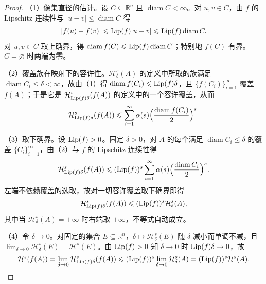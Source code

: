 \documentclass[../../main.tex]{subfiles}%
\begin{document}
\begin{proof}
（1）像集直径的估计。设 $C\subseteq\mathbb{R}^n$ 且 $\operatorname{diam}C<\infty$。对 $u,v\in C$，由 $f$ 的 Lipschitz 连续性与 $\lvert u-v\rvert\leqslant\operatorname{diam}C$ 得
\begin{align*}
\lvert f(u)-f(v)\rvert\leqslant\operatorname{Lip}(f)\lvert u-v\rvert\leqslant\operatorname{Lip}(f)\operatorname{diam}C .
\end{align*}
对 $u,v\in C$ 取上确界，得 $\operatorname{diam}f(C)\leqslant\operatorname{Lip}(f)\operatorname{diam}C$；特别地 $f(C)$ 有界。$C=\varnothing$ 时两端为零。

（2）覆盖族在映射下的容许性。$\mathcal{H}^s_\delta(A)$ 的定义中所取的族满足 $\operatorname{diam}C_i\leqslant\delta<\infty$，故由（1）得 $\operatorname{diam}f(C_i)\leqslant\operatorname{Lip}(f)\delta$，且 $\{f(C_i)\}_{i=1}^{\infty}$ 覆盖 $f(A)$；于是它是 $\mathcal{H}^s_{\operatorname{Lip}(f)\delta}(f(A))$ 的定义中的一个容许覆盖，从而
\begin{align*}
\mathcal{H}^s_{\operatorname{Lip}(f)\delta}(f(A))\leqslant\sum_{i=1}^{\infty}\alpha(s)\Bigl(\frac{\operatorname{diam}f(C_i)}{2}\Bigr)^s .
\end{align*}

（3）取下确界。设 $\operatorname{Lip}(f)>0$。固定 $\delta>0$，对 $A$ 的每个满足 $\operatorname{diam}C_i\leqslant\delta$ 的覆盖 $\{C_i\}_{i=1}^{\infty}$，由（2）与 $f$ 的 Lipschitz 连续性得
\begin{align*}
\mathcal{H}^s_{\operatorname{Lip}(f)\delta}(f(A))
\leqslant(\operatorname{Lip}(f))^s\sum_{i=1}^{\infty}\alpha(s)\Bigl(\frac{\operatorname{diam}C_i}{2}\Bigr)^s .
\end{align*}
左端不依赖覆盖的选取，故对一切容许覆盖取下确界即得
\begin{align*}
\mathcal{H}^s_{\operatorname{Lip}(f)\delta}(f(A))\leqslant(\operatorname{Lip}(f))^s\mathcal{H}^s_\delta(A),
\end{align*}
其中当 $\mathcal{H}^s_\delta(A)=+\infty$ 时右端取 $+\infty$，不等式自动成立。

（4）令 $\delta\to0$。对固定的集合 $E\subseteq\mathbb{R}^n$，$\delta\mapsto\mathcal{H}^s_\delta(E)$ 随 $\delta$ 减小而单调不减，且 $\lim_{\delta\to0}\mathcal{H}^s_\delta(E)=\mathcal{H}^s(E)$。由 $\operatorname{Lip}(f)>0$ 知 $\delta\to0$ 时 $\operatorname{Lip}(f)\delta\to0$，故
\begin{align*}
\mathcal{H}^s(f(A))=\lim_{\delta\to0}\mathcal{H}^s_{\operatorname{Lip}(f)\delta}(f(A))
\leqslant(\operatorname{Lip}(f))^s\lim_{\delta\to0}\mathcal{H}^s_\delta(A)=(\operatorname{Lip}(f))^s\mathcal{H}^s(A).
\end{align*}


\end{proof}
\end{document}
